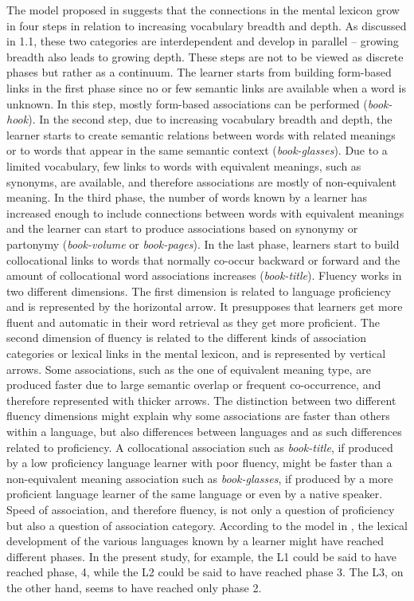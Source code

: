 \documentclass[output=paper,colorlinks,citecolor=brown,nonflat]{langsci/langscibook}
\begin{document}
The model proposed in  suggests that the connections in the mental lexicon grow in four steps in relation to increasing vocabulary breadth and depth. As discussed in 1.1, these two categories are interdependent and develop in parallel – growing breadth also leads to growing depth. These steps are not to be viewed as discrete phases but rather as a continuum. The learner starts from building form-based links in the first phase since no or few semantic links are available when a word is unknown. In this step, mostly form-based associations can be performed (\textit{book-hook}). In the second step, due to increasing vocabulary breadth and depth, the learner starts to create semantic relations between words with related meanings or to words that appear in the same semantic context (\textit{book-glasses}). Due to a limited vocabulary, few links to words with equivalent meanings, such as synonyms, are available, and therefore associations are mostly of non-equivalent meaning. In the third phase, the number of words known by a learner has increased enough to include connections between words with equivalent meanings and the learner can start to produce associations based on synonymy or partonymy (\textit{book-volume} or \textit{book-pages}). In the last phase, learners start to build collocational links to words that normally co-occur backward or forward and the amount of collocational word associations increases (\textit{book-title}). Fluency works in two different dimensions. The first dimension is related to language proficiency and is represented by the horizontal arrow. It presupposes that learners get more fluent and automatic in their word retrieval as they get more proficient. The second dimension of fluency is related to the different kinds of association categories or lexical links in the mental lexicon, and is represented by vertical arrows. Some associations, such as the one of equivalent meaning type, are produced faster due to large semantic overlap or frequent co-occurrence, and therefore represented with thicker arrows. The distinction between two different fluency dimensions might explain why some associations are faster than others within a language, but also differences between languages and as such differences related to proficiency. A collocational association such as \textit{book-title}, if produced by a low proficiency language learner with poor fluency, might be faster than a non-equivalent meaning association such as \textit{book-glasses}, if produced by a more proficient language learner of the same language or even by a native speaker. Speed of association, and therefore fluency, is not only a question of proficiency but also a question of association category. According to the model in , the lexical development of the various languages known by a learner might have reached different phases. In the present study, for example, the L1 could be said to have reached phase, 4, while the L2 could be said to have reached phase 3. The L3, on the other hand, seems to have reached only phase 2.
\end{document}
